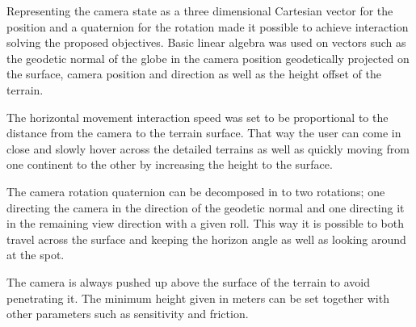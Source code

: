 Representing the camera state as a three dimensional Cartesian vector for the position and a quaternion for the rotation made it possible to achieve interaction solving the proposed objectives. Basic linear algebra was used on vectors such as the geodetic normal of the globe in the camera position geodetically projected on the surface, camera position and direction as well as the height offset of the terrain.

The horizontal movement interaction speed was set to be proportional to the distance from the camera to the terrain surface. That way the user can come in close and slowly hover across the detailed terrains as well as quickly moving from one continent to the other by increasing the height to the surface.

The camera rotation quaternion can be decomposed in to two rotations; one directing the camera in the direction of the geodetic normal and one directing it in the remaining view direction with a given roll. This way it is possible to both travel across the surface and keeping the horizon angle as well as looking around at the spot.

The camera is always pushed up above the surface of the terrain to avoid penetrating it. The minimum height given in meters can be set together with other parameters such as sensitivity and friction.
